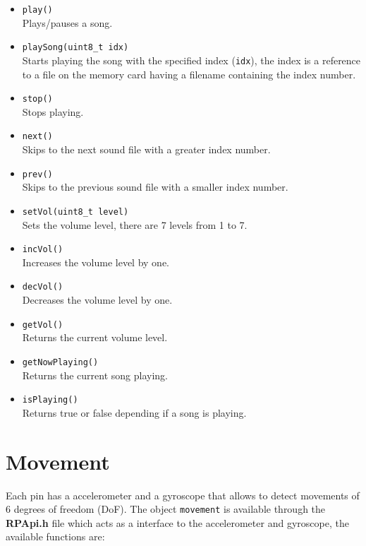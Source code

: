 \documentclass[a4paper, twoside, final]{book}%
\begin{document}
\begin{itemize}
  \item \texttt{play()}\\
    Plays/pauses a song.
  \item \texttt{playSong(uint8\_t idx)}\\
    Starts playing the song with the specified index (\texttt{idx}), the index is a reference to a file on the memory card having a filename containing the index number.
  \item \texttt{stop()}\\
    Stops playing.
  \item \texttt{next()}\\
    Skips to the next sound file with a greater index number.
  \item \texttt{prev()}\\
    Skips to the previous sound file with a smaller index number.
  \item \texttt{setVol(uint8\_t level)}\\
    Sets the volume level, there are 7 levels from 1 to 7.
  \item \texttt{incVol()}\\
    Increases the volume level by one.
  \item \texttt{decVol()}\\
    Decreases the volume level by one.
  \item \texttt{getVol()}\\
    Returns the current volume level.
  \item \texttt{getNowPlaying()}\\
    Returns the current song playing.
  \item \texttt{isPlaying()}\\
    Returns true or false depending if a song is playing.
\end{itemize}


\section{Movement}

Each pin has a accelerometer and a gyroscope that allows to detect movements of 6 degrees of freedom (DoF).
The object \texttt{movement} is available through the \textbf{RPApi.h} file which acts as a interface to the accelerometer and gyroscope, 
the available functions are:
\end{document}
